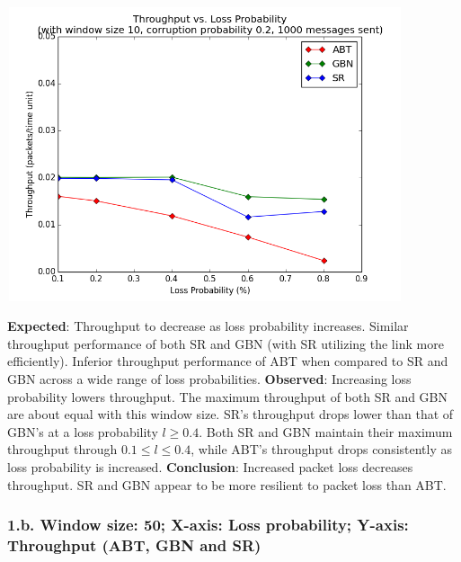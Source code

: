 \documentclass{article}
\begin{document}
\begin{center}
    \includegraphics[width=330pt,height=245pt]{images/exp1g1.png}
\end{center}

\textbf{Expected}: Throughput to decrease as loss probability increases. Similar throughput performance of both SR and GBN (with SR utilizing the link more efficiently). Inferior throughput performance of ABT when compared to SR and GBN across a wide range of loss probabilities. 
\newline\newline
\textbf{Observed}: Increasing loss probability lowers throughput. The maximum throughput of both SR and GBN are about equal with this window size. SR's throughput drops lower than that of GBN's at a loss probability $l\ge0.4$. Both SR and GBN maintain their maximum throughput through $0.1 \le l \le 0.4$, while ABT's throughput drops consistently as loss probability is increased.
\newline\newline
\textbf{Conclusion}: Increased packet loss decreases throughput. SR and GBN appear to be more resilient to packet loss than ABT.

\pagebreak

\subsubsection{1.b. Window size: 50; X-axis: Loss probability; Y-axis: Throughput (ABT, GBN and SR)}
\end{document}
